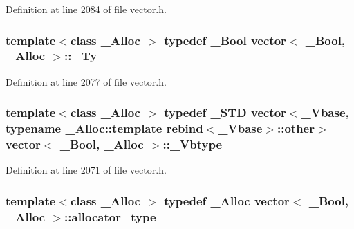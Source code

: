Definition at line 2084 of file vector.\+h.

\hypertarget{classvector_3_01___bool_00_01___alloc_01_4_aa52755d5f25533b3a4db77fa17b528a7}{
\subsubsection[{\+\_\+\+Ty}]{\setlength{\rightskip}{0pt plus 5cm}template$<$class \+\_\+\+Alloc $>$ typedef \+\_\+\+Bool {\bf vector}$<$ \+\_\+\+Bool, \+\_\+\+Alloc $>$\+::{\bf \+\_\+\+Ty}}}\label{classvector_3_01___bool_00_01___alloc_01_4_aa52755d5f25533b3a4db77fa17b528a7}


Definition at line 2077 of file vector.\+h.

\hypertarget{classvector_3_01___bool_00_01___alloc_01_4_a75194d2d323a8ab90a486691176345f5}{
\subsubsection[{\+\_\+\+Vbtype}]{\setlength{\rightskip}{0pt plus 5cm}template$<$class \+\_\+\+Alloc $>$ typedef \+\_\+\+S\+T\+D {\bf vector}$<${\bf \+\_\+\+Vbase}, typename \+\_\+\+Alloc\+::template rebind$<${\bf \+\_\+\+Vbase}$>$\+::other$>$ {\bf vector}$<$ \+\_\+\+Bool, \+\_\+\+Alloc $>$\+::{\bf \+\_\+\+Vbtype}}}\label{classvector_3_01___bool_00_01___alloc_01_4_a75194d2d323a8ab90a486691176345f5}


Definition at line 2071 of file vector.\+h.

\hypertarget{classvector_3_01___bool_00_01___alloc_01_4_a5d383a2381a0b1643f8c2b9618286c95}{
\subsubsection[{allocator\+\_\+type}]{\setlength{\rightskip}{0pt plus 5cm}template$<$class \+\_\+\+Alloc $>$ typedef \+\_\+\+Alloc {\bf vector}$<$ \+\_\+\+Bool, \+\_\+\+Alloc $>$\+::{\bf allocator\+\_\+type}}}\label{classvector_3_01___bool_00_01___alloc_01_4_a5d383a2381a0b1643f8c2b9618286c95}


